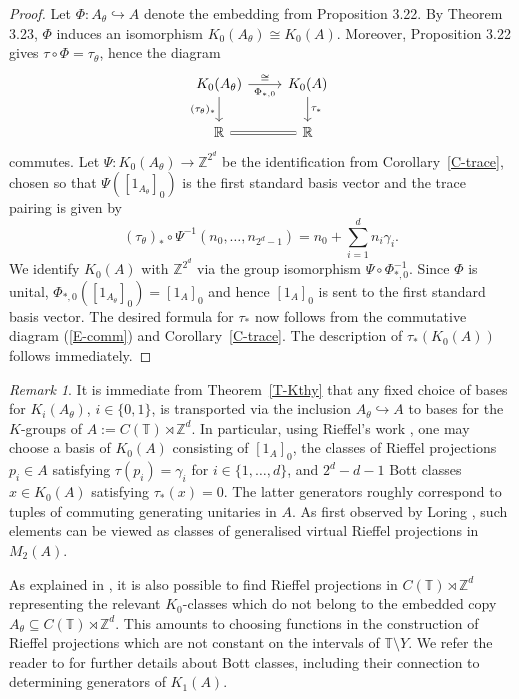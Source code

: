 \documentclass[11pt,a4paper,leqno]{amsart}
\theoremstyle{definition}
\theoremstyle{remark}
\newtheorem{rem}[thm]{Remark}
\numberwithin{equation}{section}
\theoremstyle{plain}
\newcommand{\Zb}{\mathbb{Z}}
\newcommand{\Tb}{\mathbb{T}}
\newcommand{\Rb}{\mathbb{R}}
\begin{document}
\begin{proof}
Let \(\Phi:A_\theta\hookrightarrow A\) denote the embedding from
Proposition 3.22. By Theorem 3.23, \(\Phi\) induces an isomorphism $K_0(A_\theta)\cong K_0(A)$. Moreover, Proposition 3.22 gives $\tau\circ \Phi=\tau_\theta$, hence the diagram
\begin{equation}\label{E-comm}
\begin{tikzcd}
	{K_0(A_\theta)} & {K_0(A)} \\
	\Rb & \Rb
	\arrow["{\cong}", "{\Phi_{*,0}}"', from=1-1, to=1-2]
	\arrow["{(\tau_{\theta})_*}"', from=1-1, to=2-1]
	\arrow["{\tau_*}", from=1-2, to=2-2]
	\arrow[equal, from=2-1, to=2-2]
\end{tikzcd}
\end{equation}
commutes. Let $\Psi:K_0(A_\theta) \to \Zb^{2^d}$ be the identification from Corollary~\ref{C-trace}, chosen so that $\Psi([1_{A_\theta}]_0)$ is the first standard basis vector and the trace pairing is given by 
\[
	(\tau_\theta)_* \circ \Psi^{-1}(n_0,\ldots,n_{2^d-1}) = n_0 + \sum_{i=1}^d n_i \gamma_i.
\]
We identify $K_0(A)$ with $\Zb^{2^d}$ via the group isomorphism $\Psi \circ \Phi_{*,0}^{-1}$. Since $\Phi$ is unital, $\Phi_{*,0}([1_{A_\theta}]_0) = [1_A]_0$ and hence $[1_A]_0$ is sent to the first standard basis vector. The desired formula for $\tau_*$ now follows from the commutative diagram (\ref{E-comm}) and Corollary~\ref{C-trace}. The description of $\tau_*(K_0(A))$ follows immediately. 
\end{proof}

\begin{rem}\label{R-gen}
	It is immediate from Theorem~\ref{T-Kthy} that any fixed choice of bases
	for $K_i(A_\theta)$, $i\in\{0,1\}$, is transported via the inclusion
	$A_\theta\hookrightarrow A$ to bases for the $K$-groups of
	$A:= C(\Tb)\rtimes \Zb^d$. In particular, using Rieffel's work
	\cite{Rie88}, one may choose a basis of $K_0(A)$ consisting of
	$[1_A]_0$, the classes of Rieffel projections $p_i\in A$ satisfying
	$\tau(p_i)=\gamma_i$ for $i\in\{1,\ldots,d\}$, and $2^d-d-1$ Bott classes 			$x\in K_0(A)$ satisfying $\tau_*(x)=0$. The latter generators roughly 				correspond to tuples of commuting generating unitaries in $A$. As first				observed by Loring \cite{Lor88}, such elements can be viewed as classes of 			generalised virtual Rieffel projections in $M_2(A)$.

	As explained in \cite{PutSchSka86}, it is also possible to find Rieffel
	projections in $C(\Tb)\rtimes \Zb^d$ representing the relevant
	$K_0$-classes which do not belong to the embedded copy
	$A_\theta\subseteq C(\Tb)\rtimes \Zb^d$. This amounts to choosing
	functions in the construction of Rieffel projections
	which are not constant on the intervals of $\Tb\setminus Y$. We refer
	the reader to \cite[\S 2]{Bar16} for further details about Bott classes,
	including their connection to determining generators of $K_1(A)$.
\end{rem}
\end{document}
